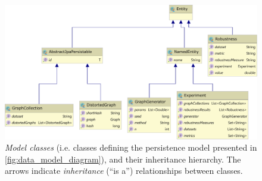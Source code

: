 \begin{figure}
\includegraphics[width=\linewidth]{data_model_classes_diagram.pdf}
\caption{\textsl{Model classes} (i.e. classes defining the persistence model presented in \autoref{fig:data_model_diagram}), and their inheritance hierarchy.
The arrows indicate \textsl{inheritance} (``is a'') relationships between classes.}
\label{fig:data_model_classes_diagram}
\end{figure}
